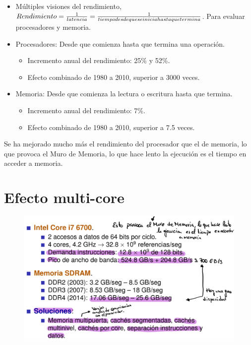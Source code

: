 \documentclass[12pt, twoside, openright]{report} %
\begin{document}
    \begin{itemize}
    
    \item
      Múltiples visiones del rendimiento,
      \(Rendimiento =\frac 1 {latencia}= \frac 1 {tiempo\space desde\space que\space se\space inicia\space hasta\space que\space termina}\).
      Para evaluar procesadores y memoria.
    \item
      Procesadores: Desde que comienza hasta que termina una operación.

      \begin{itemize}
      
      \item
        Incremento anual del rendimiento: 25\% y 52\%.
      \item
        Efecto combinado de 1980 a 2010, superior a 3000 veces.
      \end{itemize}
    \item
      Memoria: Desde que comienza la lectura o escritura hasta que
      termina.

      \begin{itemize}
      
      \item
        Incremento anual del rendimiento: 7\%.
      \item
        Efecto combinado de 1980 a 2010, superior a 7.5 veces.
      \end{itemize}
    \end{itemize}

    Se ha mejorado mucho más el rendimiento del procesador que el de
    memoria, lo que provoca el Muro de Memoria, lo que hace lento la
    ejecución es el tiempo en acceder a memoria.
  
    \section{Efecto multi-core}
    \begin{figure}[H]
      {\includegraphics[scale=.4]{Untitled 13.png}}
    \end{figure}
\end{document}
